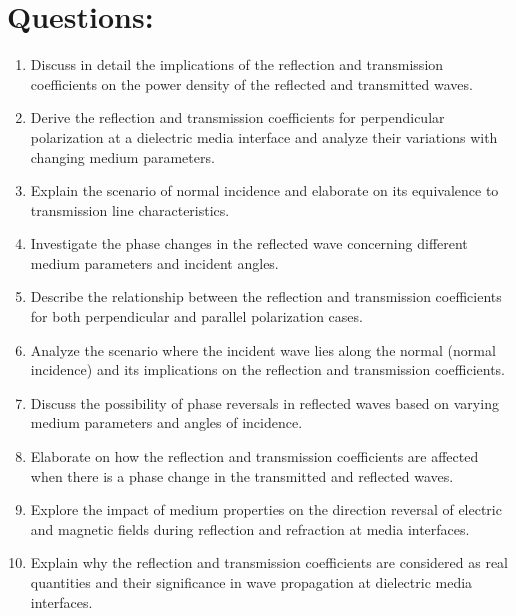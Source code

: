 \section*{Questions:}
\begin{enumerate}
    \item Discuss in detail the implications of the reflection and transmission coefficients on the power density of the reflected and transmitted waves.
    \item Derive the reflection and transmission coefficients for perpendicular polarization at a dielectric media interface and analyze their variations with changing medium parameters.
    \item Explain the scenario of normal incidence and elaborate on its equivalence to transmission line characteristics.
    \item Investigate the phase changes in the reflected wave concerning different medium parameters and incident angles.
    \item Describe the relationship between the reflection and transmission coefficients for both perpendicular and parallel polarization cases.
    \item Analyze the scenario where the incident wave lies along the normal (normal incidence) and its implications on the reflection and transmission coefficients.
    \item Discuss the possibility of phase reversals in reflected waves based on varying medium parameters and angles of incidence.
    \item Elaborate on how the reflection and transmission coefficients are affected when there is a phase change in the transmitted and reflected waves.
    \item Explore the impact of medium properties on the direction reversal of electric and magnetic fields during reflection and refraction at media interfaces.
    \item Explain why the reflection and transmission coefficients are considered as real quantities and their significance in wave propagation at dielectric media interfaces.
\end{enumerate}
